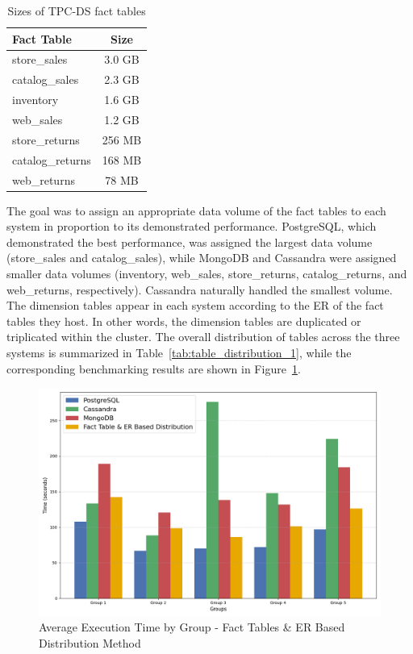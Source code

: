 \documentclass[conference]{IEEEtran}
\begin{document}
\begin{table}[h!]
    \centering
    \renewcommand{\arraystretch}{1.2}
    \caption{Sizes of TPC-DS fact tables}
    \begin{tabular}{|l|c|}
        \hline
        \textbf{Fact Table} & \textbf{Size} \\
        \hline
        store\_sales        & 3.0 GB        \\
        \hline
        catalog\_sales      & 2.3 GB        \\
        \hline
        inventory           & 1.6 GB        \\
        \hline
        web\_sales          & 1.2 GB        \\
        \hline
        store\_returns      & 256 MB        \\
        \hline
        catalog\_returns    & 168 MB        \\
        \hline
        web\_returns        & 78 MB         \\
        \hline
    \end{tabular}
    \label{tab:fact_table_sizes}
\end{table}


The goal was to assign an appropriate data volume of the fact tables to each system in proportion to its demonstrated performance. PostgreSQL, which demonstrated the best performance, was assigned the largest data volume (store\_sales and catalog\_sales), while MongoDB and Cassandra were assigned smaller data volumes (inventory, web\_sales, store\_returns, catalog\_returns, and web\_returns, respectively). Cassandra naturally handled the smallest volume. The dimension tables appear in each system according to the ER of the fact tables they host. In other words, the dimension tables are duplicated or triplicated within the cluster.
The overall distribution of tables across the three systems is summarized in Table~\ref{tab:table_distribution_1}, while the corresponding benchmarking results are shown in Figure~\ref{fig:dist_method_1}.

\begin{figure}[htbp]
    \centering
    \includegraphics[width=\linewidth]{figures/dist_method_1.png}
    \caption{Average Execution Time by Group - Fact Tables \& ER Based Distribution Method}
    \label{fig:dist_method_1}
\end{figure}
\end{document}
